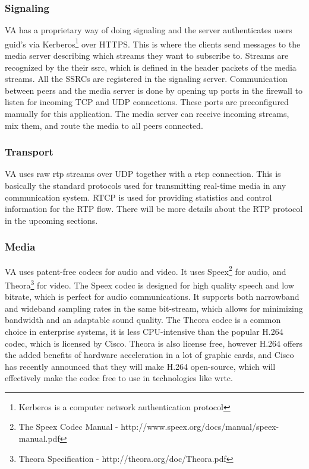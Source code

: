 \subsubsection{Signaling}
VA has a proprietary way of doing signaling and the server authenticates users \gls{guid}'s via Kerberos\footnote{Kerberos is a computer network authentication protocol} over HTTPS. This is where the clients send messages to the media server describing which streams they want to subscribe to. Streams are recognized by the their \gls{ssrc}, which is defined in the header packets of the media streams. All the SSRCs are registered in the signaling server. Communication between peers and the media server is done by opening up ports in the firewall to listen for incoming TCP and UDP connections. These ports are preconfigured manually for this application. The media server can receive incoming streams, mix them, and route the media to all peers connected.

\subsubsection{Transport}
VA uses raw \gls{rtp} streams over UDP together with a \gls{rtcp} connection. This is basically the standard protocols used for transmitting real-time media in any communication system. RTCP is used for providing statistics and control information for the RTP flow. There will be more details about the RTP protocol in the upcoming sections.

\subsubsection{Media}
VA uses patent-free codecs for audio and video. It uses Speex\footnote{The Speex Codec Manual - http://www.speex.org/docs/manual/speex-manual.pdf} for audio, and Theora\footnote{Theora Specification - http://theora.org/doc/Theora.pdf} for video. The Speex codec is designed for high quality speech and low bitrate, which is perfect for audio communications. It supports both narrowband and wideband sampling rates in the same bit-stream\cite{speex}, which allows for minimizing bandwidth and an adaptable sound quality. The Theora codec is a common choice in enterprise systems, it is less CPU-intensive than the popular H.264 codec\cite{theora}, which is licensed by Cisco. Theora is also license free, however H.264 offers the added benefits of hardware acceleration in a lot of graphic cards, and Cisco has recently announced that they will make H.264 open-source\cite{h264-free}, which will effectively make the codec free to use in technologies like \gls{wrtc}.

